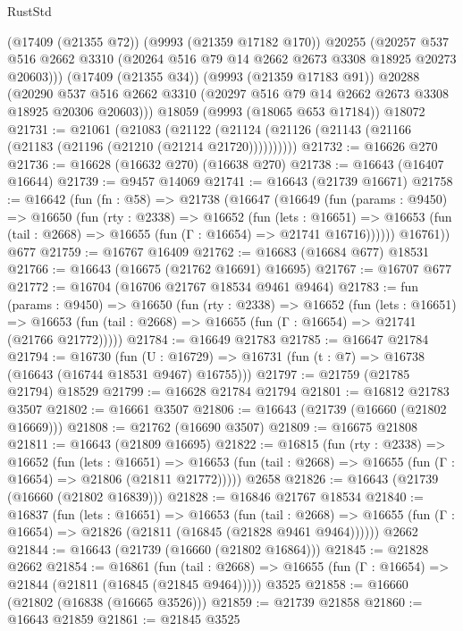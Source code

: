 \begin{lexlean}{RustStd}
\begin{coremodule}
        (@17409 (@21355 @72))
        (@9993 (@21359 @17182 @170))
        @20255
        (@20257 @537 @516 @2662 @3310 (@20264 @516 @79 @14 @2662 @2673 @3308 @18925 @20273 @20603)))
      (@17409 (@21355 @34))
      (@9993 (@21359 @17183 @91))
      @20288
      (@20290 @537 @516 @2662 @3310 (@20297 @516 @79 @14 @2662 @2673 @3308 @18925 @20306 @20603)))
    @18059
    (@9993 (@18065 @653 @17184))
    @18072
@21731 := @21061
    (@21083 (@21122 (@21124 (@21126 (@21143 (@21166 (@21183 (@21196 (@21210 (@21214 @21720))))))))))
@21732 := @16626 @270
@21736 := @16628 (@16632 @270) (@16638 @270)
@21738 := @16643 (@16407 @16644)
@21739 := @9457 @14069
@21741 := @16643 (@21739 @16671)
@21758 := @16642
    (fun (fn : @58) =>
    @21738
      (@16647
        (@16649
          (fun (params : @9450) =>
          @16650
            (fun (rty : @2338) =>
            @16652
              (fun (lets : @16651) =>
              @16653 (fun (tail : @2668) => @16655 (fun (Γ : @16654) => @21741 @16716))))))
        @16761))
    @677
@21759 := @16767 @16409
@21762 := @16683 (@16684 @677) @18531
@21766 := @16643 (@16675 (@21762 @16691) @16695)
@21767 := @16707 @677
@21772 := @16704 (@16706 @21767 @18534 @9461 @9464)
@21783 := fun (params : @9450) =>
  @16650
    (fun (rty : @2338) =>
    @16652
      (fun (lets : @16651) =>
      @16653 (fun (tail : @2668) => @16655 (fun (Γ : @16654) => @21741 (@21766 @21772)))))
@21784 := @16649 @21783
@21785 := @16647 @21784
@21794 := @16730
    (fun (U : @16729) => @16731 (fun (t : @7) => @16738 (@16643 (@16744 @18531 @9467) @16755)))
@21797 := @21759 (@21785 @21794) @18529
@21799 := @16628 @21784 @21794
@21801 := @16812 @21783 @3507
@21802 := @16661 @3507
@21806 := @16643 (@21739 (@16660 (@21802 @16669)))
@21808 := @21762 (@16690 @3507)
@21809 := @16675 @21808
@21811 := @16643 (@21809 @16695)
@21822 := @16815
    (fun (rty : @2338) =>
    @16652
      (fun (lets : @16651) =>
      @16653 (fun (tail : @2668) => @16655 (fun (Γ : @16654) => @21806 (@21811 @21772)))))
    @2658
@21826 := @16643 (@21739 (@16660 (@21802 @16839)))
@21828 := @16846 @21767 @18534
@21840 := @16837
    (fun (lets : @16651) =>
    @16653
      (fun (tail : @2668) =>
      @16655 (fun (Γ : @16654) => @21826 (@21811 (@16845 (@21828 @9461 @9464))))))
    @2662
@21844 := @16643 (@21739 (@16660 (@21802 @16864)))
@21845 := @21828 @2662
@21854 := @16861
    (fun (tail : @2668) => @16655 (fun (Γ : @16654) => @21844 (@21811 (@16845 (@21845 @9464)))))
    @3525
@21858 := @16660 (@21802 (@16838 (@16665 @3526)))
@21859 := @21739 @21858
@21860 := @16643 @21859
@21861 := @21845 @3525

\end{coremodule}
\end{lexlean}
